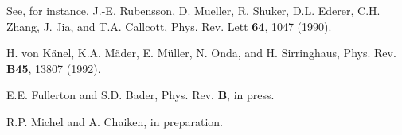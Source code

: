 {\begin{references}
 See, for instance, J.-E. Rubensson, D. Mueller,
R.  Shuker, D.L. Ederer, C.H. Zhang, J. Jia, and T.A.
Callcott, Phys. Rev. Lett {\bf 64}, 1047 (1990).

%



 H. von K\"anel, K.A. M\"ader, E. M\"uller, N. Onda,
and H. Sirringhaus,  Phys. Rev. {\bf B45}, 13807 (1992).

 E.E. Fullerton and S.D. Bader, Phys. Rev. {\bf
B}, in press.

 R.P. Michel and A. Chaiken, in preparation.

\end{references}
}

{\newpage
\clearpage
\samepage \begin{figure}
\label{magcurves}
\end{figure}
}

{\newpage
\clearpage
\samepage \begin{figure}%

\label{refspect}
\end{figure}
}

{\newpage
\clearpage
\samepage \begin{figure}
\label{allxrf}
\end{figure}
}

{\newpage
\clearpage
\samepage \begin{figure}
\label{nexafs}
\end{figure}
}



